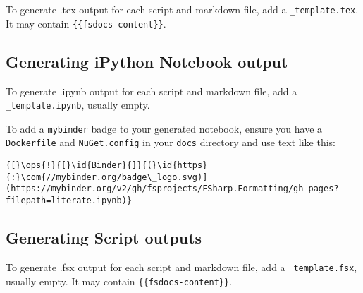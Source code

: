 \documentclass{article}
\newcommand{\id}[1]{\textcolor{black}{#1}}
\newcommand{\com}[1]{\textcolor{officegreen}{#1}}
\newcommand{\ops}[1]{\textcolor{purple}{#1}}
\begin{document}
To generate .tex output for each script and markdown file, add a \texttt{\_template.tex}.
It may contain \texttt{\{\{fsdocs-content\}\}}.
\subsection*{Generating iPython Notebook output}



To generate .ipynb output for each script and markdown file, add a \texttt{\_template.ipynb}, usually empty.


To add a \texttt{mybinder} badge to your generated notebook, ensure you have a \texttt{Dockerfile} and \texttt{NuGet.config}
in your \texttt{docs} directory and use text like this:
\begin{Verbatim}[commandchars=\\\{\}]
{[}\ops{!}{[}\id{Binder}{]}{(}\id{https}{:}\com{//mybinder.org/badge\_logo.svg)](https://mybinder.org/v2/gh/fsprojects/FSharp.Formatting/gh-pages?filepath=literate.ipynb)}

\end{Verbatim}

\subsection*{Generating Script outputs}



To generate .fsx output for each script and markdown file, add a \texttt{\_template.fsx}, usually empty.
It may contain \texttt{\{\{fsdocs-content\}\}}.
\end{document}

